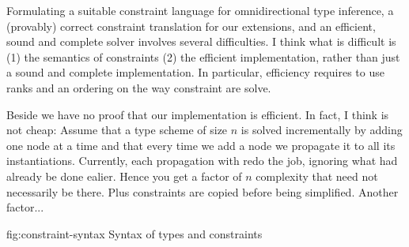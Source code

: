 \documentclass[acmsmall,screen,nonacm]{acmart}
\begin{document}
\begin{version}{}
Formulating a suitable constraint language for omnidirectional type
inference, a (provably) correct constraint translation for our extensions,
and an efficient, sound and complete solver involves several difficulties.
\Xdidier
{I think what is difficult is (1) the semantics of constraints (2) the
efficient implementation, rather than just a sound and complete
implementation. In particular, efficiency requires to use ranks and an
ordering on the way constraint are solve.}

\Xdidier
{Beside we have no proof that our implementation is efficient. In fact, I
think is not cheap: Assume that a type scheme of size $n$ is solved
incrementally by adding one node at a time and that every time we add a node
we propagate it to all its instantiations. Currently, each propagation with
redo the job, ignoring what had already be done ealier. Hence you get a
factor of $n$ complexity that need not necessarily be there. Plus
constraints are copied before being simplified. Another factor...}


\end{version}

\begin{bnffig}[t]%
  {fig:constraint-syntax}%
  {Syntax of types and constraints}
\\
\\
\\
\entry[Constraints]{\C}{
        \ctrue
  \and  \cfalse
  \and  \Cone \cand \Ctwo
  \and  \cexists \cv \c
  \and 	\cfor \tv \c
  \And  \cunif \tone \ttwo
  \nextline
  \and  \clet \x \cv \Cone \Ctwo
  \and  \cinst \x \t
  \nextline
  \and  \cmatch \t  \D  \hf
}\\
\entry[Shapes] \sh {\tvs \F \and \ldots}
\\
 \D {\eset \and \D, \tv \and \D, \x}
\end{bnffig}
\end{document}
